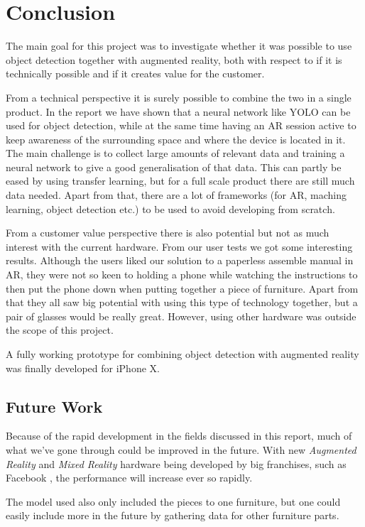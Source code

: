 \chapter{Conclusion}
The main goal for this project was to investigate whether it was possible to
use object detection together with augmented reality, both with respect to
if it is technically possible and if it creates value for the customer.

From a technical perspective it is surely possible to combine the two in a single
product. In the report we have shown that a neural network like
YOLO can be used for object detection, while at the same time having an AR 
session active to keep awareness of the surrounding space and where the device 
is located in it. The main challenge is to collect large amounts of relevant data and
training a neural network to give a good generalisation of that data. This can 
partly be eased by using transfer learning, but for a full scale product there are
still much data needed.
Apart from that, there are a lot of frameworks (for AR, maching learning, 
object detection etc.) to be used to avoid developing from scratch.

From a customer value perspective there is also potential but not as much
interest with the current hardware. From our user tests we got some interesting
results. Although the users liked our solution to a paperless assemble manual in
AR, they were not so keen to holding a phone while watching the instructions to
then put the phone down when putting together a piece of furniture.
Apart from that they all saw big potential with using this type of technology
together, but a pair of glasses would be really great. However, using other 
hardware was outside the scope of this project.

A fully working prototype for combining object detection with augmented reality
was finally developed for iPhone X.

\section{Future Work}

Because of the rapid development in the fields discussed in this report, much of what we've gone through could be improved in the future. With new \textit{Augmented Reality} and \textit{Mixed Reality} hardware being developed by big franchises, such as Facebook \cite{facebookAR}, the performance will increase ever so rapidly.

The model used also only included the pieces to one furniture, but one could easily include more in the future by gathering data for other furniture parts.

